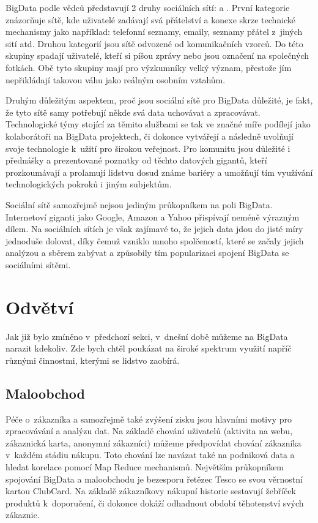 BigData podle vědců představují 2 druhy sociálních sítí:  a . První kategorie znázorňuje sítě, kde uživatelé zadávají svá přátelství a konexe skrze technické mechanismy jako například: telefonní seznamy, emaily, seznamy přátel z~jiných sití atd. Druhou kategorií jsou sítě odvozené od komunikačních vzorců. Do této skupiny spadají uživatelé, kteří si píšou zprávy nebo jsou označení na společných fotkách. Obě tyto skupiny mají pro výzkumníky velký význam, přestože jím nepřikládají takovou váhu jako reálným osobním vztahům. \cite{social} %

Druhým důležitým aspektem, proč jsou sociální sítě pro BigData důležité, je fakt, že tyto sítě samy potřebují někde svá data uchovávat a zpracovávat. Technologické týmy stojící za těmito službami se tak ve značné míře podílejí jako kolaborátoři na BigData projektech, či dokonce vytvářejí a následně uvolňují svoje technologie k~užití pro širokou veřejnost. Pro komunitu jsou důležité i přednášky a prezentované poznatky od těchto datových gigantů, kteří prozkoumávají a prolamují lidstvu dosud známe bariéry a umožňují tím využívání technologických pokroků i jiným subjektům. 

Sociální sítě samozřejmě nejsou jediným průkopníkem na poli BigData. Internetoví giganti jako Google, Amazon a Yahoo přispívají neméně výrazným dílem. Na sociálních sítích je však zajímavé to, že jejich data jdou do jisté míry jednoduše dolovat, díky čemuž vzniklo mnoho spolčeností, které se začaly jejich analýzou a sběrem zabývat a způsobily tím popularizaci spojení BigData se sociálními sítěmi. 


\section{Odvětví}

Jak již bylo zmíněno v~předchozí sekci, v~dnešní době můžeme na BigData narazit kdekoliv. Zde bych chtěl poukázat na široké spektrum využití napříč různými činnostmi, kterými se lidstvo zaobírá.\cite{sektory}

\subsection{Maloobchod}
Péče o~zákazníka a samozřejmě také zvýšení zisku jsou hlavními motivy pro zpracovávání a analýzu dat. Na základě chování uživatelů (aktivita na webu, zákaznická karta, anonymní zákazníci) můžeme předpovídat chování zákazníka v~každém stádiu nákupu. Toto chování lze navázat také na podniková data a hledat korelace pomocí Map Reduce mechanismů. Největším průkopníkem spojování BigData a maloobchodu je bezesporu řetězec Tesco se svou věrnostní kartou ClubCard. Na základě zákazníkovy nákupní historie sestavují žebříček produktů k~doporučení, či dokonce dokáží odhadnout období těhotenství svých zákaznic.\cite{tesco}

